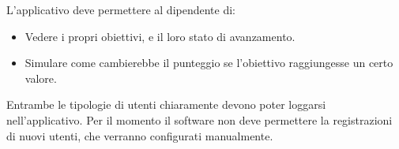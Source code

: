 L'applicativo deve permettere al dipendente di:
\begin{itemize}
    \item Vedere i propri obiettivi, e il loro stato di avanzamento.
    \item Simulare come cambierebbe il punteggio se l'obiettivo raggiungesse un certo valore.
\end{itemize}

Entrambe le tipologie di utenti chiaramente devono poter loggarsi nell'applicativo.
Per il momento il software non deve permettere la registrazioni di nuovi utenti, che verranno configurati manualmente.




